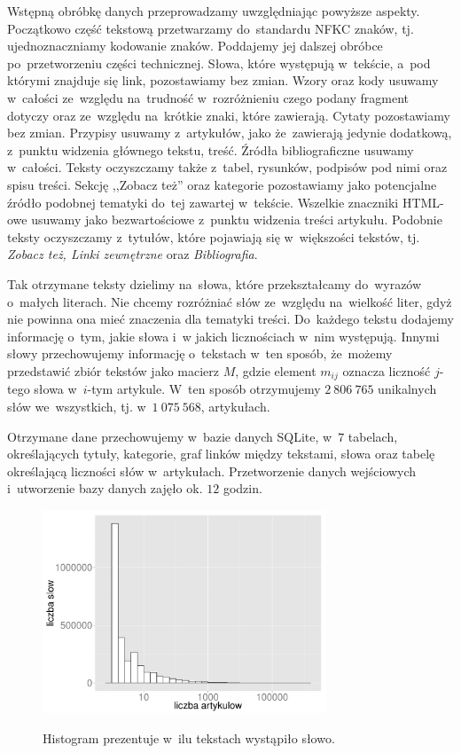 \documentclass{praca1}
\begin{document}
Wstępną obróbkę danych przeprowadzamy uwzględniając powyższe aspekty. Początkowo część tekstową przetwarzamy do~standardu NFKC znaków, tj. ujednoznaczniamy kodowanie znaków. Poddajemy jej dalszej obróbce po~przetworzeniu części technicznej. Słowa, które występują w~tekście, a~pod którymi znajduje się link, pozostawiamy bez zmian. Wzory oraz kody usuwamy w~całości ze~względu na~trudność w~rozróżnieniu czego podany fragment dotyczy oraz ze~względu na~krótkie znaki, które zawierają. Cytaty pozostawiamy bez zmian. Przypisy usuwamy z~artykułów, jako że~zawierają jedynie dodatkową, z~punktu widzenia głównego tekstu, treść. Źródła bibliograficzne usuwamy w~całości. Teksty oczyszczamy także z~tabel, rysunków, podpisów pod nimi oraz spisu treści. Sekcję ,,Zobacz też'' oraz kategorie pozostawiamy jako potencjalne źródło podobnej tematyki do~tej zawartej w~tekście. Wszelkie znaczniki HTML-owe usuwamy jako bezwartościowe z~punktu widzenia treści artykułu. Podobnie teksty oczyszczamy z~tytułów, które pojawiają się w~większości tekstów, tj. \emph{Zobacz też, Linki zewnętrzne} oraz \emph{Bibliografia}. 

Tak otrzymane teksty dzielimy na~słowa, które przekształcamy do~wyrazów o~małych literach. Nie chcemy rozróżniać słów ze~względu na~wielkość liter, gdyż nie powinna ona mieć znaczenia dla tematyki treści. Do~każdego tekstu dodajemy informację o~tym, jakie słowa i~w jakich licznościach w~nim występują. Innymi słowy przechowujemy informację o~tekstach w~ten sposób, że~możemy przedstawić zbiór tekstów jako macierz $M$, gdzie element $m_{ij}$ oznacza liczność $j$-tego słowa w~$i$-tym artykule. W~ten sposób otrzymujemy $2\ 806\ 765$ unikalnych słów we~wszystkich, tj. w~$1\ 075\ 568$, artykułach. 

Otrzymane dane przechowujemy w~bazie danych SQLite, w~$7$ tabelach, określających tytuły, kategorie, graf linków między tekstami, słowa oraz tabelę określającą liczności słów w~artykułach. Przetworzenie danych wejściowych i~utworzenie bazy danych zajęło ok. $12$ godzin.

\begin{figure}[!h]
  \centering
  \includegraphics[width=240pt]{plot1.pdf}\\
  \caption{Histogram prezentuje w~ilu tekstach wystąpiło słowo.}\label{plot:001}
\end{figure}
\end{document}
